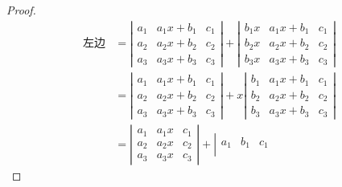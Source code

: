\begin{proof}
$$
\begin{array}{rl}
  \mbox{左边} &= \left|
                \begin{array}{ccc}
                  a_1 & a_1x+b_1 & c_1\\
                  a_2 & a_2x+b_2 & c_2\\
                  a_3 & a_3x+b_3 & c_3        
                \end{array}
                                   \right| + \left|
                                   \begin{array}{ccc}
                                     b_1x & a_1x+b_1 & c_1\\
                                     b_2x & a_2x+b_2 & c_2\\
                                     b_3x & a_3x+b_3 & c_3        
                                   \end{array}
                                                       \right|\\[0.2in]
              &= \left|
                \begin{array}{ccc}
                  a_1 & a_1x+b_1 & c_1\\
                  a_2 & a_2x+b_2 & c_2\\
                  a_3 & a_3x+b_3 & c_3        
                \end{array}
                                   \right| + x\left|
                                   \begin{array}{ccc}
                                     b_1 & a_1x+b_1 & c_1\\
                                     b_2 & a_2x+b_2 & c_2\\
                                     b_3 & a_3x+b_3 & c_3        
                                   \end{array}
                                                      \right|\\[0.2in]
              &= \left|
                \begin{array}{ccc}
                  a_1 & a_1x & c_1\\
                  a_2 & a_2x & c_2\\
                  a_3 & a_3x & c_3        
                \end{array}
                               \right| + \left|
                               \begin{array}{ccc}
                                 a_1 & b_1 & c_1\\

\end{array}
\end{array}$$
\end{proof}
